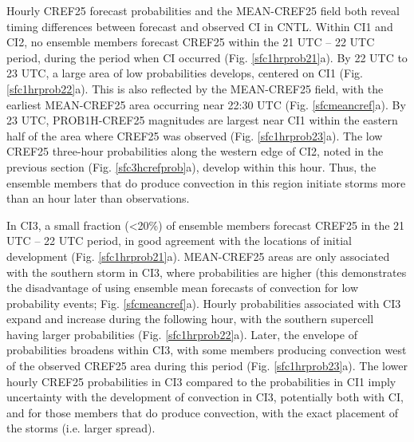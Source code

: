 Hourly CREF25 forecast probabilities and the MEAN-CREF25 field both reveal timing differences between forecast and observed CI in CNTL. Within CI1 and CI2, no ensemble members forecast CREF25 within the 21 UTC -- 22 UTC period, during the period when CI occurred (Fig. \ref{sfc1hrprob21}a). By 22 UTC to 23 UTC, a large area of low probabilities develops, centered on CI1 (Fig. \ref{sfc1hrprob22}a). This is also reflected by the MEAN-CREF25 field, with the earliest MEAN-CREF25 area occurring near 22:30 UTC (Fig. \ref{sfcmeancref}a). By 23 UTC, PROB1H-CREF25 magnitudes are largest near CI1 within the eastern half of the area where CREF25 was observed (Fig. \ref{sfc1hrprob23}a). The low CREF25 three-hour probabilities along the western edge of CI2, noted in the previous section (Fig. \ref{sfc3hcrefprob}a), develop within this hour. Thus, the ensemble members that do produce convection in this region initiate storms more than an hour later than observations.

In CI3, a small fraction (\textless 20\%) of ensemble members forecast CREF25 in the 21 UTC -- 22 UTC period, in good agreement with the locations of initial development (Fig. \ref{sfc1hrprob21}a). MEAN-CREF25 areas are only associated with the southern storm in CI3, where probabilities are higher (this demonstrates the disadvantage of using ensemble mean forecasts of convection for low probability events; Fig. \ref{sfcmeancref}a). Hourly probabilities associated with CI3 expand and increase during the following hour, with the southern supercell having larger probabilities (Fig. \ref{sfc1hrprob22}a). Later, the envelope of probabilities broadens within CI3, with some members producing convection west of the observed CREF25 area during this period (Fig. \ref{sfc1hrprob23}a). The lower hourly CREF25 probabilities in CI3 compared to the probabilities in CI1 imply uncertainty with the development of convection in CI3, potentially both with CI, and for those members that do produce convection, with the exact placement of the storms (i.e. larger spread).

